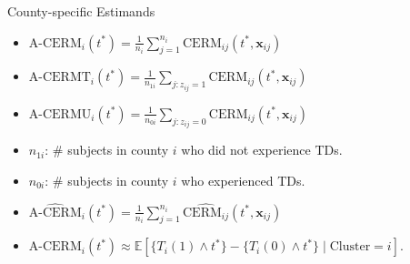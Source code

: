 \documentclass{beamer}
\begin{document}
    
\begin{frame}{County-specific Estimands}
    \begin{itemize}
   
    \vfill \item  \( {\text{A-CERM}}_i(t^*) = \frac{1}{n_i} \sum_{j=1}^{n_i} {\text{CERM}_{ij}}(t^*, \mathbf{x}_{ij}) \)
   
    \vfill \item $\text{A-CERMT}_i(t^*) = \frac{1}{n_{1i}} \sum_{j: z_{ij}=1} \text{CERM}_{ij}(t^*,\mathbf{x}_{ij})$

    \vfill \item $\text{A-CERMU}_i(t^*) = \frac{1}{n_{0i}} \sum_{j: z_{ij}=0} \text{CERM}_{ij}(t^*,\mathbf{x}_{ij})$
    \vfill \item $n_{1i}$:  \# subjects in county $i$ who did not experience TDs.
     \vfill \item $n_{0i}$:  \# subjects in county $i$ who experienced TDs.
    \pause \vfill \item \( \widehat{\text{A-CERM}}_i(t^*) = \frac{1}{n_i} \sum_{j=1}^{n_i} \widehat{\text{CERM}_{ij}}(t^*, \mathbf{x}_{ij}) \)
     \vfill \item $ {\text{A-CERM}}_i(t^*) \approx \mathbb{E}[\{T_i(1) \wedge t^*\} - \{T_i(0) \wedge t^*\} \mid \text{Cluster}=i]$.
\end{itemize}
\end{frame}
\end{document}
